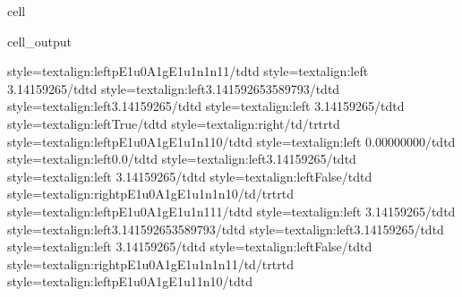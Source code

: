 \documentclass[letterpaper,table,10pt,english]{jupyterBook}
\begin{document}
\begin{sphinxuseclass}{cell}
\begin{sphinxVerbatimOutput}
\begin{sphinxuseclass}{cell_output}
\begin{sphinxVerbatim}[commandchars=\\\{\}]
style=\PYGZbs{}\PYGZsq{}text\PYGZhy{}align:left\PYGZbs{}\PYGZsq{}\PYGZgt{}p\PYGZus{}E1u\PYGZus{}0\PYGZus{}A1g\PYGZus{}E1u\PYGZus{}1\PYGZus{}n1\PYGZus{}n1\PYGZus{}1\PYGZlt{}/td\PYGZgt{}\PYGZlt{}td style=\PYGZbs{}\PYGZsq{}text\PYGZhy{}align:left\PYGZbs{}\PYGZsq{}\PYGZgt{} 3.14159265\PYGZlt{}/td\PYGZgt{}\PYGZlt{}td style=\PYGZbs{}\PYGZsq{}text\PYGZhy{}align:left\PYGZbs{}\PYGZsq{}\PYGZgt{}3.141592653589793\PYGZlt{}/td\PYGZgt{}\PYGZlt{}td style=\PYGZbs{}\PYGZsq{}text\PYGZhy{}align:left\PYGZbs{}\PYGZsq{}\PYGZgt{}\PYGZhy{}3.14159265\PYGZlt{}/td\PYGZgt{}\PYGZlt{}td style=\PYGZbs{}\PYGZsq{}text\PYGZhy{}align:left\PYGZbs{}\PYGZsq{}\PYGZgt{} 3.14159265\PYGZlt{}/td\PYGZgt{}\PYGZlt{}td style=\PYGZbs{}\PYGZsq{}text\PYGZhy{}align:left\PYGZbs{}\PYGZsq{}\PYGZgt{}True\PYGZlt{}/td\PYGZgt{}\PYGZlt{}td style=\PYGZbs{}\PYGZsq{}text\PYGZhy{}align:right\PYGZbs{}\PYGZsq{}\PYGZgt{}\PYGZlt{}/td\PYGZgt{}\PYGZlt{}/tr\PYGZgt{}\PYGZlt{}tr\PYGZgt{}\PYGZlt{}td style=\PYGZbs{}\PYGZsq{}text\PYGZhy{}align:left\PYGZbs{}\PYGZsq{}\PYGZgt{}p\PYGZus{}E1u\PYGZus{}0\PYGZus{}A1g\PYGZus{}E1u\PYGZus{}1\PYGZus{}n1\PYGZus{}1\PYGZus{}0\PYGZlt{}/td\PYGZgt{}\PYGZlt{}td style=\PYGZbs{}\PYGZsq{}text\PYGZhy{}align:left\PYGZbs{}\PYGZsq{}\PYGZgt{} 0.00000000\PYGZlt{}/td\PYGZgt{}\PYGZlt{}td style=\PYGZbs{}\PYGZsq{}text\PYGZhy{}align:left\PYGZbs{}\PYGZsq{}\PYGZgt{}0.0\PYGZlt{}/td\PYGZgt{}\PYGZlt{}td style=\PYGZbs{}\PYGZsq{}text\PYGZhy{}align:left\PYGZbs{}\PYGZsq{}\PYGZgt{}\PYGZhy{}3.14159265\PYGZlt{}/td\PYGZgt{}\PYGZlt{}td style=\PYGZbs{}\PYGZsq{}text\PYGZhy{}align:left\PYGZbs{}\PYGZsq{}\PYGZgt{} 3.14159265\PYGZlt{}/td\PYGZgt{}\PYGZlt{}td style=\PYGZbs{}\PYGZsq{}text\PYGZhy{}align:left\PYGZbs{}\PYGZsq{}\PYGZgt{}False\PYGZlt{}/td\PYGZgt{}\PYGZlt{}td style=\PYGZbs{}\PYGZsq{}text\PYGZhy{}align:right\PYGZbs{}\PYGZsq{}\PYGZgt{}p\PYGZus{}E1u\PYGZus{}0\PYGZus{}A1g\PYGZus{}E1u\PYGZus{}1\PYGZus{}n1\PYGZus{}n1\PYGZus{}0\PYGZlt{}/td\PYGZgt{}\PYGZlt{}/tr\PYGZgt{}\PYGZlt{}tr\PYGZgt{}\PYGZlt{}td style=\PYGZbs{}\PYGZsq{}text\PYGZhy{}align:left\PYGZbs{}\PYGZsq{}\PYGZgt{}p\PYGZus{}E1u\PYGZus{}0\PYGZus{}A1g\PYGZus{}E1u\PYGZus{}1\PYGZus{}n1\PYGZus{}1\PYGZus{}1\PYGZlt{}/td\PYGZgt{}\PYGZlt{}td style=\PYGZbs{}\PYGZsq{}text\PYGZhy{}align:left\PYGZbs{}\PYGZsq{}\PYGZgt{} 3.14159265\PYGZlt{}/td\PYGZgt{}\PYGZlt{}td style=\PYGZbs{}\PYGZsq{}text\PYGZhy{}align:left\PYGZbs{}\PYGZsq{}\PYGZgt{}3.141592653589793\PYGZlt{}/td\PYGZgt{}\PYGZlt{}td style=\PYGZbs{}\PYGZsq{}text\PYGZhy{}align:left\PYGZbs{}\PYGZsq{}\PYGZgt{}\PYGZhy{}3.14159265\PYGZlt{}/td\PYGZgt{}\PYGZlt{}td style=\PYGZbs{}\PYGZsq{}text\PYGZhy{}align:left\PYGZbs{}\PYGZsq{}\PYGZgt{} 3.14159265\PYGZlt{}/td\PYGZgt{}\PYGZlt{}td style=\PYGZbs{}\PYGZsq{}text\PYGZhy{}align:left\PYGZbs{}\PYGZsq{}\PYGZgt{}False\PYGZlt{}/td\PYGZgt{}\PYGZlt{}td style=\PYGZbs{}\PYGZsq{}text\PYGZhy{}align:right\PYGZbs{}\PYGZsq{}\PYGZgt{}p\PYGZus{}E1u\PYGZus{}0\PYGZus{}A1g\PYGZus{}E1u\PYGZus{}1\PYGZus{}n1\PYGZus{}n1\PYGZus{}1\PYGZlt{}/td\PYGZgt{}\PYGZlt{}/tr\PYGZgt{}\PYGZlt{}tr\PYGZgt{}\PYGZlt{}td style=\PYGZbs{}\PYGZsq{}text\PYGZhy{}align:left\PYGZbs{}\PYGZsq{}\PYGZgt{}p\PYGZus{}E1u\PYGZus{}0\PYGZus{}A1g\PYGZus{}E1u\PYGZus{}1\PYGZus{}1\PYGZus{}n1\PYGZus{}0\PYGZlt{}/td\PYGZgt{}\PYGZlt{}td 
\end{sphinxVerbatim}
\end{sphinxuseclass}
\end{sphinxVerbatimOutput}
\end{sphinxuseclass}
\end{document}
